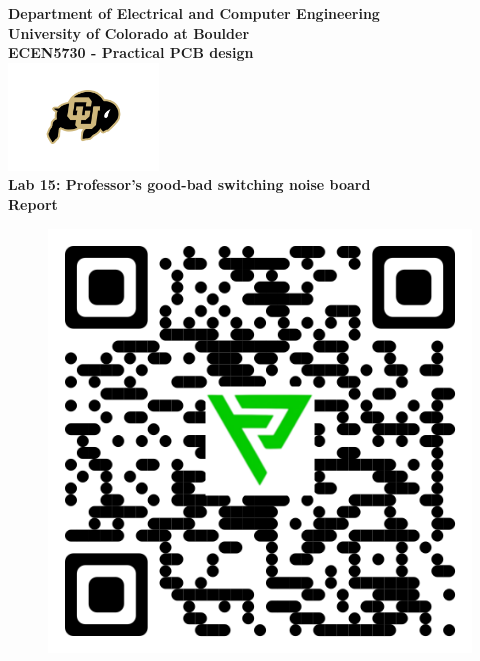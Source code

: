 \begin{titlepage}
\center %

\textbf{\large Department of Electrical and Computer Engineering}\\[0.5cm]
\textbf{\Large University of Colorado at Boulder}\\[1cm]
\textbf{\large ECEN5730 - Practical PCB design}\\[2cm]
\includegraphics[width=0.3\textwidth]{figures/cu}\\[2cm] 

	

\textbf{\Huge Lab 15: Professor's good-bad switching noise board}\\[0.2cm]

\textbf{\Large Report}\\[2cm]
\vspace{1.5cm}
\begin{figure}[H]
	\centering
	\includegraphics[scale=0.2]{figures/qr_download.png}
	\label{555_schematic}
\end{figure}\vspace{1.5cm}



\end{titlepage}
